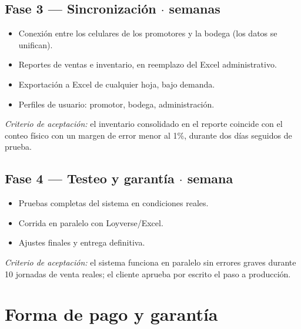 \documentclass[11pt,a4paper]{article}
\begin{document}
\subsection*{Fase 3 --- Sincronización \quad$\cdot$ semanas}
\begin{itemize}
    \item Conexión entre los celulares de los promotores y la bodega (los datos se unifican).
    \item Reportes de ventas e inventario, en reemplazo del Excel administrativo.
    \item Exportación a Excel de cualquier hoja, bajo demanda.
    \item Perfiles de usuario: promotor, bodega, administración.
\end{itemize}
\textit{Criterio de aceptación:} el inventario consolidado en el reporte coincide con
el conteo físico con un margen de error menor al 1\%, durante dos días seguidos de prueba.

\subsection*{Fase 4 --- Testeo y garantía \quad$\cdot$ semana}
\begin{itemize}
    \item Pruebas completas del sistema en condiciones reales.
    \item Corrida en paralelo con Loyverse/Excel.
    \item Ajustes finales y entrega definitiva.
\end{itemize}
\textit{Criterio de aceptación:} el sistema funciona en paralelo sin errores graves
durante 10 jornadas de venta reales; el cliente aprueba por escrito el paso a producción.

\section{Forma de pago y garantía}

\begin{center}
\end{center}
\end{document}
